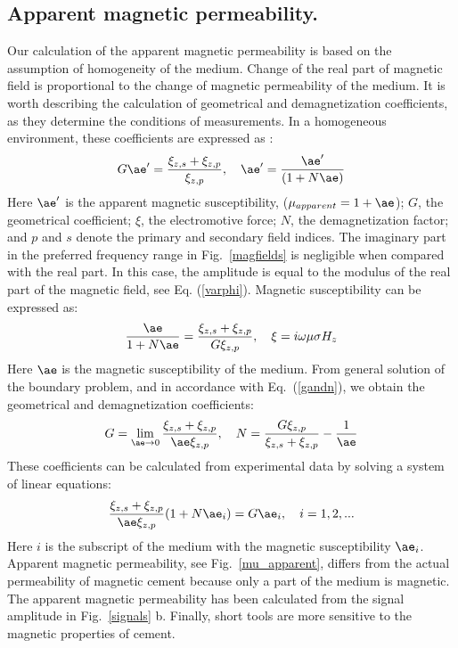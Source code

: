 \documentclass[10pt,twoside]{article}
\begin{document}
\subsection{Apparent magnetic permeability.}

{Our calculation of the apparent magnetic permeability is based on the assumption of homogeneity of the medium. Change of the real part of magnetic field is proportional to the change of magnetic permeability of the medium. It is worth describing the calculation of geometrical and demagnetization coefficients, as they determine the conditions of measurements. In a homogeneous environment, these coefficients are expressed as \citep{Saraev2004}:}
\begin{equation}
G \ae' = \frac{\xi_{z,s}+\xi_{z,p}}{\xi_{z,p}}, \quad   \ae' = \frac{\ae'}{(1+N\ae)}
\label{gandn}
\end{equation}
{Here $\ae'$ is the apparent magnetic susceptibility, ($\mu_{apparent} = 1+\ae$); $G$, the geometrical coefficient; $\xi$, the electromotive force; $N$, the demagnetization factor; and $p$ and $s$ denote the primary and secondary field indices. The imaginary part in the preferred frequency range in Fig.~\ref{magfields} is negligible when compared with the real part. In this case, the amplitude is equal to the modulus of the real part of the magnetic field, see Eq. (\ref{varphi}). Magnetic susceptibility can be expressed as:}
\begin{equation}
\frac{\ae}{1+N \ae} = \frac{\xi_{z,s}+\xi_{z,p}}{G \xi_{z,p}}, \quad   \xi = i\omega\mu\sigma H_{z}
\label{apparent_eq}
\end{equation}
Here $\ae$ is the magnetic susceptibility of the medium. From general solution of the boundary problem, and in accordance with Eq.~(\ref{gandn}), we obtain the geometrical and demagnetization coefficients:
\begin{equation}
G  = \lim_{\ae\to 0} \frac{\xi_{z,s}+\xi_{z,p}}{\ae\xi_{z,p}}, \quad N = \frac{G\xi_{z,p}}{\xi_{z,s}+\xi_{z,p}} - \frac{1}{\ae}
\label{geometric}
\end{equation}
These coefficients can be calculated from experimental data by solving a system of linear equations:
\begin{equation}
\frac{\xi_{z,s}+\xi_{z,p}}{\ae\xi_{z,p}}(1+N\ae_i)=G\ae_i,\quad i = 1,2,...
\label{lineq}
\end{equation}
{Here $i$ is the subscript of the medium with the magnetic susceptibility $\ae_i$. Apparent magnetic permeability, see Fig.~\ref{mu_apparent}, differs from the actual permeability of magnetic cement because only a part of the medium is magnetic. The apparent magnetic permeability has been calculated from the signal amplitude in Fig.~\ref{signals} b. Finally, short tools are more sensitive to the magnetic properties of cement.}
\end{document}
